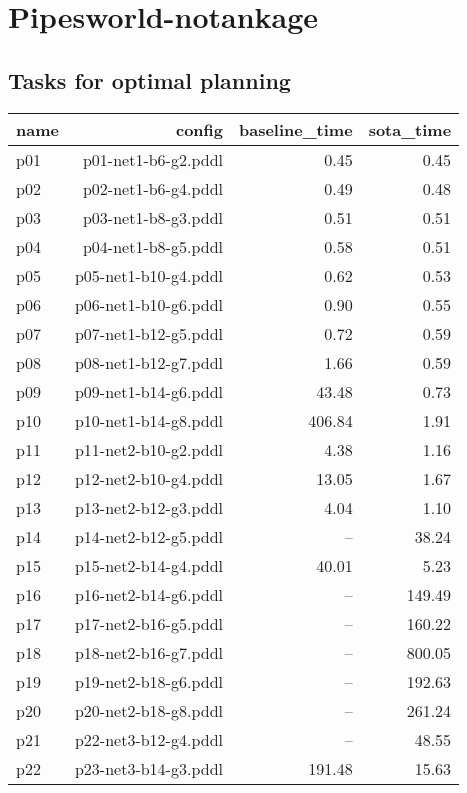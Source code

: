 \documentclass{article}
\begin{document}
                \newpage \section{Pipesworld-notankage}
                    \subsection*{Tasks for optimal planning}
                    
                            \begin{center}
                            \scriptsize
                            \begin{tabular}{@{}l|r|r|r@{}}
                            name & config & baseline\_time & sota\_time\\\midrule
                              p01& p01-net1-b6-g2.pddl&0.45&0.45\\
  p02& p02-net1-b6-g4.pddl&0.49&0.48\\
  p03& p03-net1-b8-g3.pddl&0.51&0.51\\
  p04& p04-net1-b8-g5.pddl&0.58&0.51\\
  p05& p05-net1-b10-g4.pddl&0.62&0.53\\
  p06& p06-net1-b10-g6.pddl&0.90&0.55\\
  p07& p07-net1-b12-g5.pddl&0.72&0.59\\
  p08& p08-net1-b12-g7.pddl&1.66&0.59\\
  p09& p09-net1-b14-g6.pddl&43.48&0.73\\
  p10& p10-net1-b14-g8.pddl&406.84&1.91\\
  p11& p11-net2-b10-g2.pddl&4.38&1.16\\
  p12& p12-net2-b10-g4.pddl&13.05&1.67\\
  p13& p13-net2-b12-g3.pddl&4.04&1.10\\
  p14& p14-net2-b12-g5.pddl&--&38.24\\
  p15& p15-net2-b14-g4.pddl&40.01&5.23\\
  p16& p16-net2-b14-g6.pddl&--&149.49\\
  p17& p17-net2-b16-g5.pddl&--&160.22\\
  p18& p18-net2-b16-g7.pddl&--&800.05\\
  p19& p19-net2-b18-g6.pddl&--&192.63\\
  p20& p20-net2-b18-g8.pddl&--&261.24\\
  p21& p22-net3-b12-g4.pddl&--&48.55\\
  p22& p23-net3-b14-g3.pddl&191.48&15.63\\

\end{tabular}
\end{center}
\end{document}
